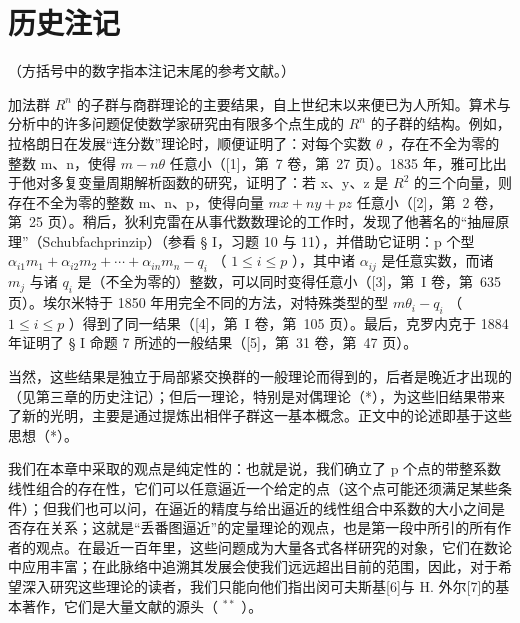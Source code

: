 \section*{历史注记}
{}

（方括号中的数字指本注记末尾的参考文献。）

加法群 \(R^{n}\) 的子群与商群理论的主要结果，自上世纪末以来便已为人所知。算术与分析中的许多问题促使数学家研究由有限多个点生成的 \(R^{n}\) 的子群的结构。例如，拉格朗日在发展“连分数”理论时，顺便证明了：对每个实数 \(\theta\) ，存在不全为零的整数 m、n，使得 \(m - n\theta\) 任意小（{[}1{]}，第~7 卷，第~27 页）。1835 年，雅可比出于他对多复变量周期解析函数的研究，证明了：若 x、y、z 是 \(R^{2}\) 的三个向量，则存在不全为零的整数 m、n、p，使得向量 \(mx + ny + pz\) 任意小（{[}2{]}，第~2 卷，第~25 页）。稍后，狄利克雷在从事代数数理论的工作时，发现了他著名的“抽屉原理”（Schubfachprinzip）（参看 § I，习题 10 与 11），并借助它证明：p 个型 \(\alpha_{i1}m_{1} + \alpha_{i2}m_{2} + \cdots + \alpha_{in}m_{n} - q_{i}\) （ \(1 \leqslant i \leqslant p\) ），其中诸 \(\alpha_{ij}\) 是任意实数，而诸 \(m_{j}\) 与诸 \(q_{i}\) 是（不全为零的）整数，可以同时变得任意小（{[}3{]}，第~I 卷，第~635 页）。埃尔米特于 1850 年用完全不同的方法，对特殊类型的型 \(m\theta_{i} - q_{i}\) （ \(1 \leqslant i \leqslant p\) ）得到了同一结果（{[}4{]}，第~I 卷，第~105 页）。最后，克罗内克于 1884 年证明了 § I 命题 7 所述的一般结果（{[}5{]}，第~31 卷，第~47 页）。

当然，这些结果是独立于局部紧交换群的一般理论而得到的，后者是晚近才出现的（见第三章的历史注记）；但后一理论，特别是对偶理论（*），为这些旧结果带来了新的光明，主要是通过提炼出相伴子群这一基本概念。正文中的论述即基于这些思想（*）。

我们在本章中采取的观点是纯定性的：也就是说，我们确立了 p 个点的带整系数线性组合的存在性，它们可以任意逼近一个给定的点（这个点可能还须满足某些条件）；但我们也可以问，在逼近的精度与给出逼近的线性组合中系数的大小之间是否存在关系；这就是“丢番图逼近”的定量理论的观点，也是第一段中所引的所有作者的观点。在最近一百年里，这些问题成为大量各式各样研究的对象，它们在数论中应用丰富；在此脉络中追溯其发展会使我们远远超出目前的范围，因此，对于希望深入研究这些理论的读者，我们只能向他们指出闵可夫斯基{[}6{]}与 H. 外尔{[}7{]}的基本著作，它们是大量文献的源头（ \(^{**}\) ）。

